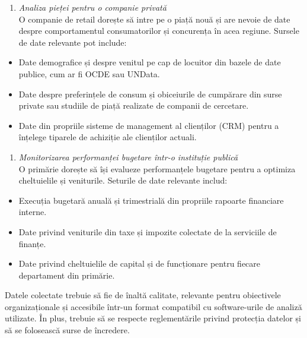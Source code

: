 \documentclass[
  11pt,
  b5paper,
  nottoc]{book}
\providecommand{\tightlist}{%
  \setlength{\itemsep}{0pt}\setlength{\parskip}{0pt}}\usepackage{longtable,booktabs,array}
\begin{document}
\begin{enumerate}
\def\labelenumi{\arabic{enumi}.}
\setcounter{enumi}{1}
\tightlist
\item
  \emph{Analiza pieței pentru o companie privată}\\
  O companie de retail dorește să intre pe o piață nouă și are nevoie de
  date despre comportamentul consumatorilor și concurența în acea
  regiune. Sursele de date relevante pot include:\\
\end{enumerate}

\begin{itemize}
\tightlist
\item
  Date demografice și despre venitul pe cap de locuitor din bazele de
  date publice, cum ar fi OCDE sau UNData.\\
\item
  Date despre preferințele de consum și obiceiurile de cumpărare din
  surse private sau studiile de piață realizate de companii de
  cercetare.\\
\item
  Date din propriile sisteme de management al clienților (CRM) pentru a
  înțelege tiparele de achiziție ale clienților actuali.
\end{itemize}

\begin{enumerate}
\def\labelenumi{\arabic{enumi}.}
\setcounter{enumi}{2}
\tightlist
\item
  \emph{Monitorizarea performanței bugetare într-o instituție publică}\\
  O primărie dorește să își evalueze performanțele bugetare pentru a
  optimiza cheltuielile și veniturile. Seturile de date relevante
  includ:\\
\end{enumerate}

\begin{itemize}
\tightlist
\item
  Execuția bugetară anuală și trimestrială din propriile rapoarte
  financiare interne.\\
\item
  Date privind veniturile din taxe și impozite colectate de la
  serviciile de finanțe.\\
\item
  Date privind cheltuielile de capital și de funcționare pentru fiecare
  departament din primărie.
\end{itemize}

Datele colectate trebuie să fie de înaltă calitate, relevante pentru
obiectivele organizaționale și accesibile într-un format compatibil cu
software-urile de analiză utilizate. În plus, trebuie să se respecte
reglementările privind protecția datelor și să se folosească surse de
încredere.
\end{document}
